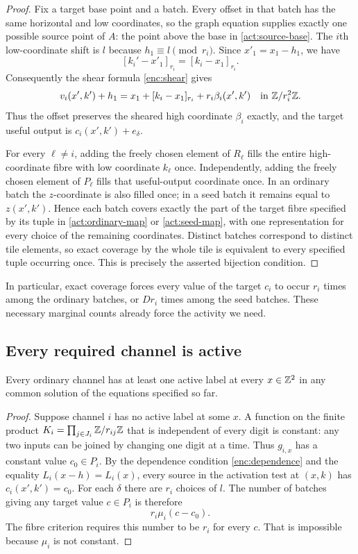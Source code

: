 \begin{proof}
Fix a target base point and a batch.  Every offset in that batch has the
same horizontal and low coordinates, so the graph equation supplies
exactly one possible source point of $A$: the point above the base in
\eqref{act:source-base}.  The $i$th low-coordinate shift is $l$ because
$h_1\equiv l\pmod{r_i}$.  Since $x'_1=x_1-h_1$, we have
\[
 [k_i'-x'_1]_{r_i}=[k_i-x_1]_{r_i}.
\]
Consequently the shear formula \eqref{enc:shear} gives
\[
 v_i(x',k')+h_1
   =x_1+[k_i-x_1]_{r_i}+r_i\beta_i(x',k')
   \quad\text{in }\mathbb Z/r_i^2\mathbb Z.
\]
Thus the offset preserves the sheared high coordinate $\beta_i$ exactly,
and the target useful output is $c_i(x',k')+e_\delta$.

For every $\ell\ne i$, adding the freely chosen element of $R_\ell$
fills the entire high-coordinate fibre with low coordinate $k_\ell$
once.  Independently, adding the freely chosen element of $P_\ell$
fills that useful-output coordinate once.  In an ordinary batch the
$z$-coordinate is also filled once; in a seed batch it remains equal
to $z(x',k')$.  Hence each batch covers exactly the part of the target
fibre specified by its tuple in \cref{act:ordinary-map} or
\cref{act:seed-map}, with one representation for every choice of the
remaining coordinates.  Distinct batches correspond to distinct tile
elements, so exact coverage by the whole tile is equivalent to every
specified tuple occurring once.  This is precisely the asserted
bijection condition.
\end{proof}

In particular, exact coverage forces every value of the target $c_i$
to occur $r_i$ times among the ordinary batches, or $D r_i$ times
among the seed batches.  These necessary marginal counts already force
the activity we need.

\subsection{Every required channel is active}

\begin{lemma}
\label{act:ordinary}
Every ordinary channel has at least one active label at every
$x\in\mathbb Z^2$ in any common solution of the equations specified so far.
\end{lemma}

\begin{proof}
Suppose channel $i$ has no active label at some $x$.  A function on the
finite product $K_i=\prod_{j\in J_i}\mathbb Z/r_{ij}\mathbb Z$ that is independent
of every digit is constant: any two inputs can be joined by changing
one digit at a time.  Thus $g_{i,x}$ has a constant value $c_0\in P_i$.
By the dependence condition \eqref{enc:dependence} and the equality
$L_i(x-h)=L_i(x)$, every source in the activation test at $(x,k)$ has
$c_i(x',k')=c_0$.  For each $\delta$ there are $r_i$ choices of $l$.
The number of batches giving any target value $c\in P_i$ is therefore
\[
 r_i\mu_i(c-c_0).
\]
The fibre criterion requires this number to be $r_i$ for every $c$.
That is impossible because $\mu_i$ is not constant.
\end{proof}

